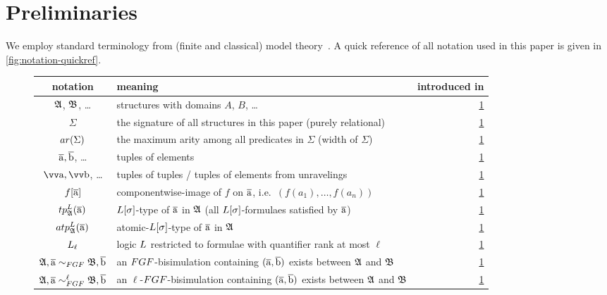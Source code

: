 
\section{Preliminaries}\label{sec:preliminaries}
We employ standard terminology from (finite and classical) model theory~\cite[Sec. 1--3]{Libkin04}.
A quick reference of all notation used in this paper is given in \cref{fig:notation-quickref}.

\begin{figure}
  \centering
  \bgroup
  \def\arraystretch{1.1}
  \begin{tabularx}{\textwidth}{c X r}
    notation & meaning & introduced in \\
    \hline
    ${\mathfrak{A}}$, ${\mathfrak{B}}$, \ldots & structures with domains $A$, $B$, \ldots & \cref{sec:preliminaries} \\
    $\Sigma$ & the signature of all structures in this paper (purely relational) & \cref{sec:preliminaries} \\
    $\arity(\Sigma)$ & the maximum arity among all predicates in $\Sigma$ (width of $\Sigma$) & \cref{sec:preliminaries} \\
    $\overline{\mathrm{a}}, \overline{\mathrm{b}}$, \ldots & tuples of elements & \cref{sec:preliminaries} \\
    $\elemtuptuplea, \elemtuptupleb$, \ldots & tuples of tuples / tuples of elements from unravelings & \cref{sec:preliminaries} \\
    $f[\overline{\mathrm{a}}]$ & componentwise-image of $f$ on $\overline{\mathrm{a}}$, i.e.\ $(f(a_{1}), \ldots, f(a_{n}))$ & \cref{sec:preliminaries} \\
    $\tp{\logicL}{\str{A}}{\elemtuplea}$ & $\logicL[\sigma]$-type of $\overline{\mathrm{a}}$ in ${\mathfrak{A}}$ (all $\logicL[\sigma]$-formulaes satisfied by $\overline{\mathrm{a}}$) & \cref{sec:preliminaries} \\
    $\atp{\logicL}{\str{A}}{\elemtuplea}$ & atomic-$\logicL[\sigma]$-type of $\overline{\mathrm{a}}$ in ${\mathfrak{A}}$ & \cref{sec:preliminaries} \\
    $\logicL_{\ell}$ & logic $\logicL$ restricted to formulae with quantifier rank at most $\ell$ & \cref{sec:preliminaries} \\
    $\str{A}, \elemtuplea \bisimto_{\FGF} \str{B}, \elemtupleb$ & an $\FGF$-bisimulation containing $(\overline{\mathrm{a}}, \overline{\mathrm{b}})$ exists between ${\mathfrak{A}}$ and ${\mathfrak{B}}$ & \cref{sec:preliminaries} \\
    $\str{A}, \elemtuplea \bisimto_{\FGF}^{\ell} \str{B}, \elemtupleb$ & an $\ell$-$\FGF$-bisimulation containing $(\overline{\mathrm{a}}, \overline{\mathrm{b}})$ exists between ${\mathfrak{A}}$ and ${\mathfrak{B}}$ & \cref{sec:preliminaries} \\

\end{tabularx}
\end{figure}
